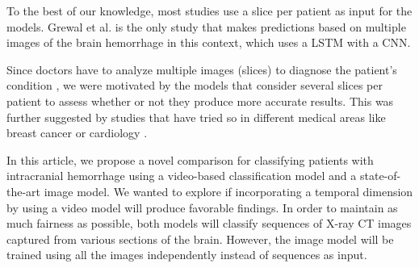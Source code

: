 To the best of our knowledge, most studies use a slice per patient as input for the models. Grewal et al. \cite{8363574} is the only study that makes predictions based on multiple images of the brain hemorrhage in this context, which uses a LSTM with a CNN. 

Since doctors have to analyze multiple images (slices) to diagnose the patient's condition \cite{Thabarsa2023299}, we were motivated by the models that consider several slices per patient to assess whether or not they produce more accurate results. This was further suggested by studies that have tried so in different medical areas like breast cancer \cite{sarker2024mvswintmammogramclassificationmultiview, swint_multiview, hybrid_mammo_net} or cardiology \cite{JMAI5205}.


In this article, we propose a novel comparison for classifying patients with intracranial hemorrhage using a video-based classification model and a state-of-the-art image model. We wanted to explore if incorporating a temporal dimension by using a video model will produce favorable findings. In order to maintain as much fairness as possible, both models will classify sequences of X-ray CT images captured from various sections of the brain. However, the image model will be trained using all the images independently instead of sequences as input.



